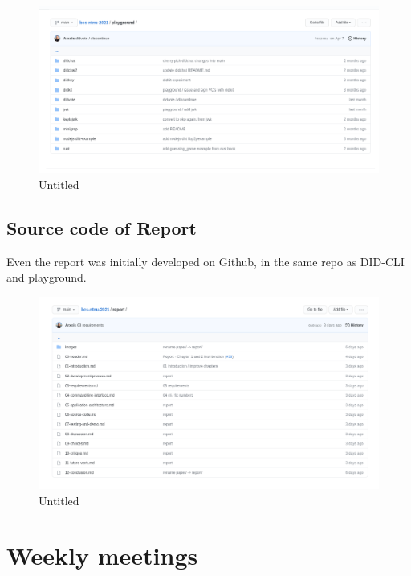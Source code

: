 \begin{figure}
\centering
\includegraphics{Development Process a132dd5987b94adf8fc5989add9afc3f/Untitled 2.png}
\caption{Untitled}
\end{figure}

\hypertarget{source-code-of-report}{%
\subsection{Source code of Report}\label{source-code-of-report}}

Even the report was initially developed on Github, in the same repo as
DID-CLI and playground.

\begin{figure}
\centering
\includegraphics{Development Process a132dd5987b94adf8fc5989add9afc3f/Untitled 3.png}
\caption{Untitled}
\end{figure}

\pagebreak

\hypertarget{weekly-meetings}{%
\section{Weekly meetings}\label{weekly-meetings}}


